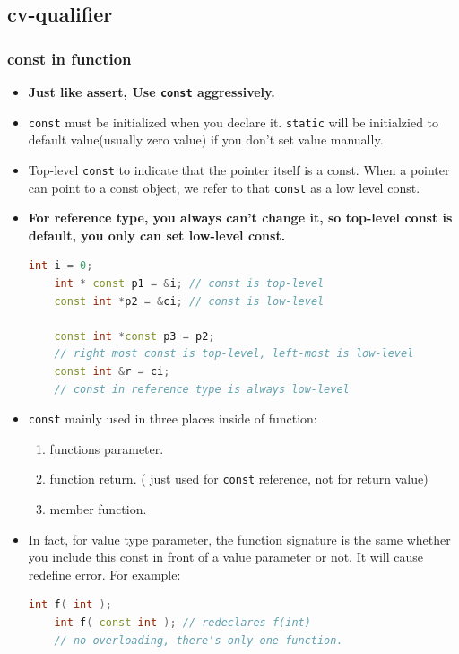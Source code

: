 \documentclass[a4paper,12pt,twoside]{book}
\begin{document}
\subsection{cv-qualifier}
\subsubsection{const in function}
\begin{itemize}
	\item \textbf{Just like assert, Use \texttt{const} aggressively.}
	
	\item \texttt{const} must be initialized when you declare it. \texttt{static} will be initialzied to default value(usually zero value) if you don't set value manually. 
	
	\item Top-level \texttt{const} to indicate that the pointer itself is a const. When a pointer can point to a const object, we refer to that \texttt{const} as a low level const.
	
	\item \textbf{For reference type, you always can't change it, so top-level const is default, you only can set low-level const.}
	\begin{lstlisting}[frame=single, language=c++]
	int i = 0;
	int * const p1 = &i; // const is top-level
	const int *p2 = &ci; // const is low-level
	
	const int *const p3 = p2;
	// right most const is top-level, left-most is low-level
	const int &r = ci;
	// const in reference type is always low-level
	\end{lstlisting}
	
	
	\item \texttt{const} mainly used in three places inside of function:
	\begin{enumerate}
		\item functions parameter.
		\item function return. ( just used for \texttt{const} reference, not for return value)
		\item member function.
	\end{enumerate}
	
	\item In fact, for value type parameter, the function signature is the same whether you include this const in front of a value parameter or not. It will cause redefine error. For example:
	\begin{lstlisting}[frame=single, language=c++]
	int f( int );
	int f( const int ); // redeclares f(int)
	// no overloading, there's only one function.
	\end{lstlisting}
	

\end{itemize}
\end{document}
